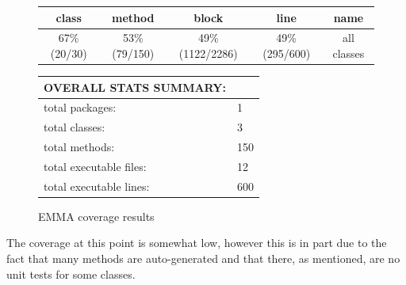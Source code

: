 \begin{figure}[ht]
\caption{EMMA coverage results}
\label{tab:emma4}
\begin{tabular}{| c | c | c | c | c |}
\hline
class & method & block & line & name \\ \hline
67\% (20/30) & 53\% (79/150) & 49\% (1122/2286) & 49\% (295/600) & all classes \\
\hline
\end{tabular}
\vspace{10pt}

\begin{tabular}{| l | l |}
\hline
OVERALL STATS SUMMARY: & \\ \hline
total packages: & 1 \\
total classes: & 3 \\
total methods: & 150 \\
total executable files: & 12 \\
total executable lines: & 600 \\
\hline
\end{tabular}
\end{figure}

The coverage at this point is somewhat low, however this is in part due to the fact that many methods are auto-generated and that there, as mentioned, are no unit tests for some classes.